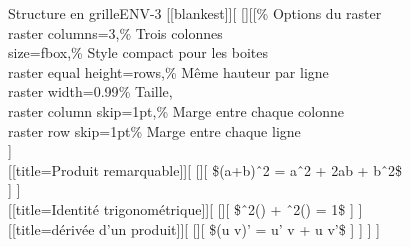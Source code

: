\begin{EXO}{Structure en grille}{ENV-3}
[[blankest]][
    [][[\textcolor{green!75!black}{\% Options du raster}\\
                    \phantom{AAA}raster columns=3,\textcolor{green!75!black}{\% Trois colonnes}\\
                    \phantom{AAA}size=fbox,\textcolor{green!75!black}{\% Style compact pour les boites}\\
                    \phantom{AAA}raster equal height=rows,\textcolor{green!75!black}{\% Même hauteur par ligne} \\
                    \phantom{AAA}raster width=0.99\textcolor{green!75!black}{\% Taille}, \\
                    \phantom{AAA}raster column skip=1pt,\textcolor{green!75!black}{\% Marge entre chaque colonne} \\
                    \phantom{AAA}raster row skip=1pt\textcolor{green!75!black}{\% Marge entre chaque ligne}\\
                    ]\\
        [[title=Produit remarquable]][
            [][
                \$(a+b)\^\ 2 = a\^\ 2 + 2ab + b\^\ 2\$\\
            ]
        ]\\
        [[title=Identité trigonométrique]][
            [][
                \$\^\ 2() + \^\ 2() = 1\$
            ]
        ]\\
        [[title=dérivée d'un produit]][
            [][
                \$(u  v)' = u'  v + u  v'\$
            ]
        ]
    ]
]
\end{EXO}

\newpage

